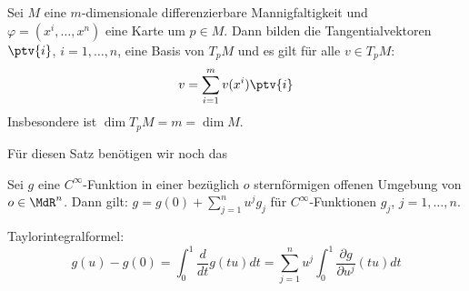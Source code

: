 \documentclass[a4paper,twoside,DIV15,BCOR12mm]{scrbook}
\begin{document}
\begin{satz}
Sei $M$ eine $m$-dimensionale differenzierbare Mannigfaltigkeit und $\varphi=(x^i,\ldots,x^n)$ eine Karte um $p\in M$. Dann bilden die Tangentialvektoren $\ptv{i}$, $i=1,\ldots,n$, eine Basis von $T_pM$ und es gilt für alle $v\in T_pM$:
\[
v = \sum_{i=1}^m v(x^i) \ptv{i}
\]
Insbesondere ist $\dim T_pM = m = \dim M$.
\label{basissatz}
\end{satz}

Für diesen Satz benötigen wir noch das
\begin{lemma}[Analysis]
Sei $g$ eine $C^\infty$-Funktion in einer bezüglich $o$ sternförmigen offenen Umgebung von $o\in \MdR^n$. Dann gilt: $g = g(0) + \sum_{j=1}^n u^jg_j$ für $C^\infty$-Funktionen $g_j$, $j=1,\ldots,n$.
\label{lem2}
\end{lemma}

\begin{beweis}
Taylorintegralformel:
\[
g(u)-g(0) = \int_0^1 \frac d{dt} g(tu) dt = \sum_{j=1}^n u^j \int_0^1 \frac{\partial g}{\partial u^j}(tu) dt
\]
\end{beweis}
\end{document}
